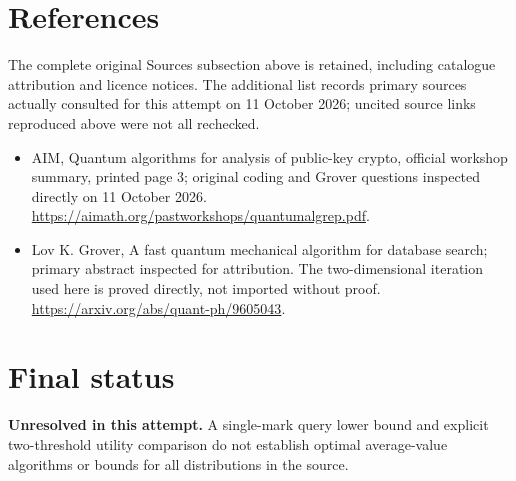 \documentclass[11pt]{article}
\begin{document}
\section{References}
The complete original Sources subsection above is retained, including catalogue attribution and licence notices. The additional list records primary sources actually consulted for this attempt on 11 October 2026; uncited source links reproduced above were not all rechecked.
\begin{itemize}
\item AIM, Quantum algorithms for analysis of public-key crypto, official workshop summary, printed page 3; original coding and Grover questions inspected directly on 11 October 2026. \url{https://aimath.org/pastworkshops/quantumalgrep.pdf}.
\item Lov K. Grover, A fast quantum mechanical algorithm for database search; primary abstract inspected for attribution. The two-dimensional iteration used here is proved directly, not imported without proof. \url{https://arxiv.org/abs/quant-ph/9605043}.
\end{itemize}
\section{Final status}
\textbf{Unresolved in this attempt.} A single-mark query lower bound and explicit two-threshold utility comparison do not establish optimal average-value algorithms or bounds for all distributions in the source.
\end{document}
